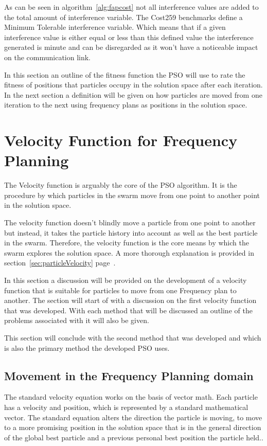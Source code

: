 As can be seen in algorithm~\ref{alg:fapcost} not all interference values are added to the total amount of interference variable. The Cost259 benchmarks define a Minimum Tolerable interference variable. Which means that if a given interference value is either equal or less than this defined value the interference generated is minute and can be disregarded as it won't have a noticeable impact on the communication link.

In this section an outline of the fitness function the PSO will use to rate the fitness of positions that particles occupy in the solution space after each iteration. In the next section a definition will be given on how particles are moved from one iteration to the next using frequency plans as positions in the solution space.
\section{Velocity Function for Frequency Planning}
\label{sec:velocityFAP}
The Velocity function is arguably the core of the PSO algorithm. It is the procedure by which particles in the swarm move from one point to another point in the solution space. 

The velocity function doesn't blindly move a particle from one point to another but instead, it takes the particle history into account as well as the best particle in the swarm. Therefore, the velocity function is the core means by which
the swarm explores the solution space. A more thorough explanation is provided in section~\ref{sec:particleVelocity} page~\pageref{sec:particleVelocity}.

In this section a discussion will be provided on the development of a velocity function that is suitable for particles to move from one Frequency plan to another. The section will start of with a discussion on the first velocity function that was developed. With each method that will be discussed an outline of the problems associated with it will also be given. 

This section will conclude with the second method that was developed and which is also the primary method the developed PSO uses.

\subsection{Movement in the Frequency Planning domain}
The standard velocity equation works on the basis of vector math. Each particle has a velocity and position, which is represented by a standard mathematical vector. The standard equation alters the direction the particle is moving, to move to a more promising position in the solution space that is in the general direction of the global best particle and a previous personal best position the particle held..

